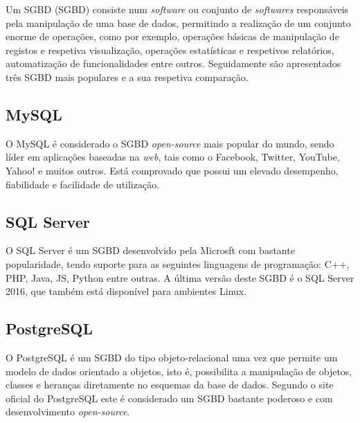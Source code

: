Um \acl{SGBD} (\acs{SGBD}) consiste num \textit{software} ou conjunto de \textit{softwares} responsáveis pela manipulação de uma base de dados, permitindo a realização de um conjunto enorme de operações, como por exemplo, operações básicas de manipulação de registos e respetiva visualização, operações estatísticas e respetivos relatórios, automatização de funcionalidades entre outros. Seguidamente são apresentados três \ac{SGBD} mais populares e a sua respetiva comparação. 


\subsection{MySQL}


O MySQL é considerado o \ac{SGBD} \textit{open-source} mais popular do mundo, sendo líder em aplicações baseadas na \textit{web}, tais como o Facebook, Twitter, YouTube, Yahoo! e muitos outros. Está comprovado que possui um elevado desempenho, fiabilidade e facilidade de utilização\cite{MySQL2011}.	






\subsection{SQL Server}

O SQL Server é um \ac{SGBD} desenvolvido pela Microsft com bastante popularidade, tendo suporte para as seguintes linguagens de programação: C++, PHP, Java, \ac{JS}, Python entre outras. A última versão deste \ac{SGBD} é o SQL Server 2016, que também está disponível para ambientes Linux\cite{linuxsqlserver}.




\subsection{PostgreSQL}

O PostgreSQL é um \ac{SGBD} do tipo objeto-relacional uma vez que permite um modelo de dados orientado a objetos, isto é, possibilita a manipulação de objetos, classes e heranças diretamente no esquemas da base de dados. Segundo o site oficial do PostgreSQL este é considerado um \ac{SGBD} bastante poderoso e com desenvolvimento \textit{open-source}\cite{ThePostgreSQLGlobalDevelopmentGroup2012}. 





